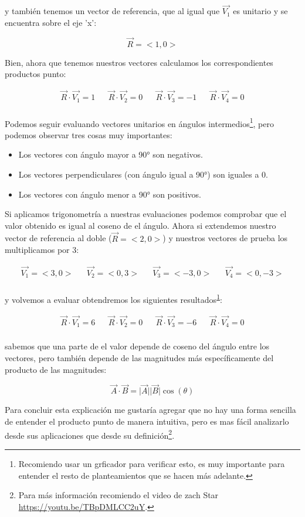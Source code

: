 \documentclass{article}
\begin{document}
y también tenemos un vector de referencia, que al igual que \(\vec{V_1}\) es unitario y se encuentra sobre el eje 'x':

\[
\vec{R} = <1,0>
\]

Bien, ahora que tenemos nuestros vectores calculamos los correspondientes productos punto:

\[\begin{aligned}
  \vec{R} \cdot \vec{V_1} = 1 &&
  \vec{R} \cdot \vec{V_2} = 0 &&
  \vec{R} \cdot \vec{V_3} = -1 &&
  \vec{R} \cdot \vec{V_4} = 0 \\
\end{aligned}\]

Podemos seguir evaluando vectores unitarios en ángulos intermedios\footnote{Recomiendo usar un grficador para verificar esto, es muy importante para entender el resto de planteamientos que se hacen más adelante.\label{org0260fed}}, pero podemos observar tres cosas muy importantes:

\begin{itemize}
\item Los vectores con ángulo mayor a 90° son negativos.
\item Los vectores perpendiculares (con ángulo igual a 90°) son iguales a 0.
\item Los vectores con ángulo menor a 90° son positivos.
\end{itemize}

Si aplicamos trigonometría a nuestras evaluaciones podemos comprobar que el valor obtenido es igual al coseno de el ángulo. Ahora si extendemos nuestro vector de referencia al doble (\(\vec{R} = <2,0>\)) y nuestros vectores de prueba los multiplicamos por 3:

\[\begin{aligned}
  \vec{V_1} = <3,0>  &&
  \vec{V_2} = <0,3>  &&
  \vec{V_3} = <-3,0> &&
  \vec{V_4} = <0,-3> \\
\end{aligned}\] 

y volvemos a evaluar obtendremos los siguientes resultados\textsuperscript{\ref{org0260fed}}:

\[\begin{aligned}
  \vec{R} \cdot \vec{V_1} = 6 &&
  \vec{R} \cdot \vec{V_2} = 0 &&
  \vec{R} \cdot \vec{V_3} = -6 &&
  \vec{R} \cdot \vec{V_4} = 0 \\
\end{aligned}\]

sabemos que una parte de el valor depende de coseno del ángulo entre los vectores, pero también depende de las magnitudes más específicamente del producto de las magnitudes:

\[
 \vec{A}\cdot\vec{B} = \vert\vec{A}\vert\vert\vec{B}\vert \cos(\theta)
\]

Para concluir esta explicación me gustaría agregar que no hay una forma sencilla de entender el producto punto de manera intuitiva, pero es mas fácil analizarlo desde sus aplicaciones que desde su definición\footnote{Para más información recomiendo el video de zach Star \url{https://youtu.be/TBpDMLCC2uY}.}.
\end{document}

